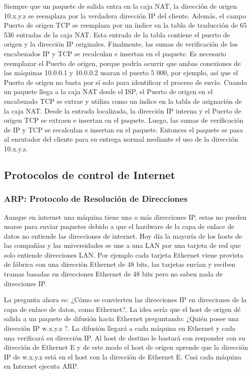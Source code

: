 \documentclass[10pt,a4paper]{report}
\begin{document}
\par Siempre que un paquete de salida entra en la caja NAT, la dirección de origen 10.x.y.z se reemplaza por la verdadera dirección IP del cliente. Además, el campo Puerto de origen TCP se reemplaza por un índice en la tabla de traducción de 65 536 entradas de la caja NAT. Esta entrada de la tabla contiene el puerto de
origen y la dirección IP originales. Finalmente, las sumas de verificación de los encabezados IP y TCP se recalculan e insertan en el paquete. Es necesario reemplazar el Puerto de origen, porque podría ocurrir que ambas conexiones de las máquinas 10.0.0.1 y 10.0.0.2 usaran el puerto 5 000, por ejemplo, así que el
Puerto de origen no basta por sí solo para identificar el proceso de envío. Cuando un paquete llega a la caja NAT desde el ISP, el Puerto de origen en el encabezado TCP se
extrae y utiliza como un índice en la tabla de asignación de la caja NAT. Desde la entrada localizada, la dirección IP interna y el Puerto de origen TCP se extraen e insertan en el paquete. Luego, las sumas de verificación de IP y TCP se recalculan e insertan en el paquete. Entonces el paquete se pasa al enrutador
del cliente para su entrega normal mediante el uso de la dirección 10.x.y.z.

\subsection{Protocolos de control de Internet}

\subsubsection{ARP: Protocolo de Resolución de Direcciones}

	\par Aunque en internet una máquina tiene una o más direcciones IP, estas no pueden usarse para enviar paquetes debido a que el hardware de la capa de enlace de datos no entiende las direcciones de internet. Hoy día la mayoría de los hosts de las compañías y las universidades se une a una LAN por una tarjeta de red que solo entiende direcciones LAN. Por ejemplo cada tarjeta Ethernet viene provista de fábrica con una dirección Ethernet de 48 bits, las tarjetas envían y reciben tramas basadas en direcciones Ethernet de 48 bits pero no saben nada de direcciones IP.
	
	\par La pregunta ahora es: ¿Cómo se convierten las direcciones IP en direcciones de la capa de enlace de datos, como Ethernet?. La idea sería que el host de origen dé salida a un paquete de difusión hacia Ethernet preguntando: ¿Quién posee una dirección IP w.x.y.z ?. La difusión llegará a cada máquina en Ethernet y cada una verificará su dirección IP. Al host de destino le bastará con responder con su dirección de Ethernet E y de este modo el host de origen aprende que la dirección IP de w.x.y.z está en el host con la dirección de Ethernet E. Casi cada máquina en Internet ejecuta ARP.
\end{document}
